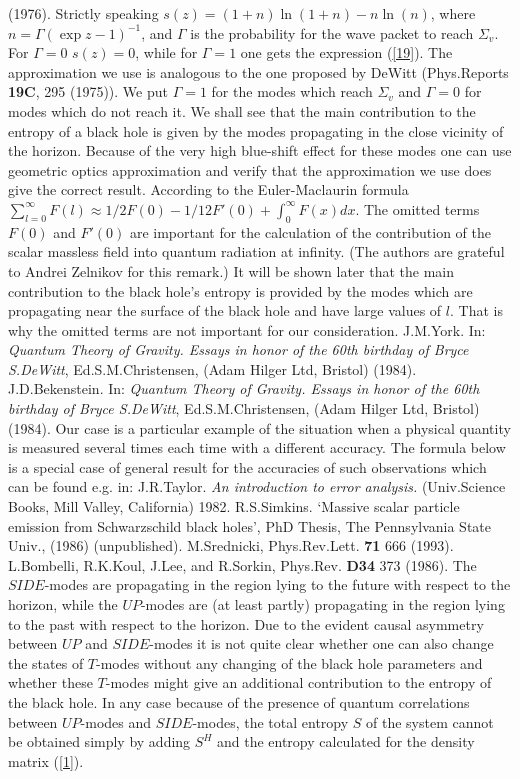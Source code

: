 \documentclass[superscriptaddress,showpacs,preprintnumbers,amsmath,amssymb,
nofootinbib,twocolumn,aps,prd,10pt]{revtex4-1}
\begin{document}
\begin{thebibliography}{99}
(1976).
 Strictly speaking $s(z) =(1+n)\ln (1+n)-n\ln (n)$,
where $n=\Gamma (\exp z -1)^{-1}$, and $\Gamma$ is the probability
for the wave packet to reach $\Sigma_v$. For $\Gamma =0$ $s(z)=0$,
while for $\Gamma =1$ one gets the expression (\ref{19}). The approximation
we use is analogous to the one proposed by DeWitt
(Phys.Reports {\bf 19C}, 295 (1975)). We put $\Gamma =1$ for the modes
which reach $\Sigma_v$ and $\Gamma =0$ for modes which do not reach it.
We shall see that the main contribution to the entropy of a black hole
is given by the modes propagating in the close vicinity of the horizon.
Because of the very high blue-shift effect for these modes one can
use geometric optics approximation and verify that the approximation
we use does give the correct result.
 According to the Euler-Maclaurin formula
$\sum_{l=0}^{\infty}F(l)\approx 1/2 F(0)-1/12 F'(0) +\int_0^{\infty}
F(x)dx$. The omitted terms $F(0)$ and $F'(0)$ are important for the
calculation
of the contribution of the scalar massless field into quantum radiation at
infinity.
(The authors are grateful to Andrei Zelnikov for this remark.) It will be
shown
later
that the main contribution to the black hole's entropy is provided by the
modes
which are propagating near the surface of the black hole and have large values
of $l$. That is why the omitted terms are not important for our consideration.
 J.M.York. In: {\em Quantum Theory of Gravity.
Essays in honor of the 60th birthday of Bryce S.DeWitt},
Ed.S.M.Christensen, (Adam Hilger Ltd, Bristol) (1984).
 J.D.Bekenstein. In: {\em Quantum Theory of Gravity.
Essays in honor of the 60th birthday of Bryce S.DeWitt},
Ed.S.M.Christensen, (Adam Hilger Ltd, Bristol) (1984).
 Our case is a particular example of the situation
when a physical quantity is measured several times each time
with a different accuracy. The formula below is a special case
of general result for the accuracies of such observations which
can be found e.g. in:  J.R.Taylor. {\em An introduction to error analysis.}
(Univ.Science Books, Mill Valley, California) 1982.
 R.S.Simkins. `Massive scalar particle emission
from Schwarzschild black holes', PhD Thesis, The Pennsylvania State Univ.,
(1986) (unpublished).
 M.Srednicki, Phys.Rev.Lett. {\bf 71} 666 (1993).
 L.Bombelli, R.K.Koul, J.Lee, and R.Sorkin,
Phys.Rev. {\bf D34} 373 (1986).
 The $SIDE$-modes are propagating in the region lying to
the future with respect to the horizon, while the $UP$-modes are (at least
partly)
propagating in the region lying to the past with respect to the horizon.
Due to the evident causal asymmetry between $UP$ and $SIDE$-modes
it is not quite clear whether one can also change the states of $T$-modes
without any changing of the black hole parameters and whether
these $T$-modes might give an additional contribution to the entropy of
the black hole. In any case because of the presence of quantum correlations
between $UP$-modes  and $SIDE$-modes, the total entropy $S$ of the system
cannot
be obtained simply by adding $S^H$ and the entropy calculated for the density
matrix (\ref{1}).

\end{thebibliography}
\end{document}
